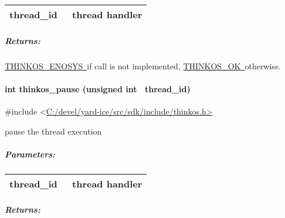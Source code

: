{\protect\hypertarget{t.d782c80b316c585f37cfeff504ed527240d62369}{}{}\protect\hypertarget{t.4}{}{}

\begin{longtable}[]{@{}ll@{}}
\toprule
\begin{minipage}[t]{0.47\columnwidth}\raggedright\strut
{thread\_id}{~}\strut
\end{minipage} & \begin{minipage}[t]{0.47\columnwidth}\raggedright\strut
{thread handler }\strut
\end{minipage}\tabularnewline
\bottomrule
\end{longtable}

\subparagraph{\texorpdfstring{{Returns:}}{Returns:}}\label{returns-5}

{\protect\hyperlink{h.3s49zyc}{THINKOS\_ENOSYS}}{\protect\hyperlink{h.3s49zyc}{~}}{if
call is not implemented,
}{\protect\hyperlink{h.2fk6b3p}{THINKOS\_OK}}{\protect\hyperlink{h.2fk6b3p}{~}}{otherwise.
}

\paragraph{\texorpdfstring{{int thinkos\_pause (unsigned int
~thread\_id)}}{int thinkos\_pause (unsigned int ~thread\_id)}}\label{int-thinkos_pause-unsigned-int-thread_id}

{}

{\#include
\textless{}}{\protect\hyperlink{h.pkwqa1}{C:/devel/yard-ice/src/sdk/include/thinkos.h}}{\protect\hyperlink{h.pkwqa1}{\textgreater{}}}

{pause the thread execution }

{}

\subparagraph{\texorpdfstring{{Parameters:}}{Parameters:}}\label{parameters-5}

\protect\hypertarget{t.d782c80b316c585f37cfeff504ed527240d62369}{}{}\protect\hypertarget{t.5}{}{}

\begin{longtable}[]{@{}ll@{}}
\toprule
\begin{minipage}[t]{0.47\columnwidth}\raggedright\strut
{thread\_id}{~}\strut
\end{minipage} & \begin{minipage}[t]{0.47\columnwidth}\raggedright\strut
{thread handler }\strut
\end{minipage}\tabularnewline
\bottomrule
\end{longtable}

\subparagraph{\texorpdfstring{{Returns:}}{Returns:}}\label{returns-6}

}
